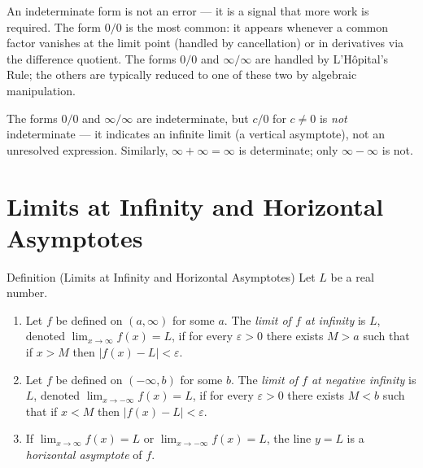 \begin{remark*}
An indeterminate form is not an error --- it is a signal that
more work is required.
The form $0/0$ is the most common: it appears whenever a common
factor vanishes at the limit point (handled by cancellation)
or in derivatives via the difference quotient.
The forms $0/0$ and $\infty/\infty$ are handled by
L'H\^opital's Rule; the others are typically reduced to one
of these two by algebraic manipulation.
\end{remark*}

\begin{remark*}
The forms $0/0$ and $\infty/\infty$ are indeterminate, but $c/0$
for $c \neq 0$ is \emph{not} indeterminate --- it indicates an
infinite limit (a vertical asymptote), not an unresolved
expression.
Similarly, $\infty + \infty = \infty$ is determinate; only
$\infty - \infty$ is not.
\end{remark*}

\section*{Limits at Infinity and Horizontal Asymptotes}

\begin{propositionbox}{Definition (Limits at Infinity and Horizontal Asymptotes)}
Let $L$ be a real number.
\begin{enumerate}
  \item Let $f$ be defined on $(a, \infty)$ for some $a$.
        The \emph{limit of $f$ at infinity} is $L$, denoted
        $\lim_{x \to \infty} f(x) = L$, if for every
        $\varepsilon > 0$ there exists $M > a$ such that if
        $x > M$ then $|f(x) - L| < \varepsilon$.

  \item Let $f$ be defined on $(-\infty, b)$ for some $b$.
        The \emph{limit of $f$ at negative infinity} is $L$,
        denoted $\lim_{x \to -\infty} f(x) = L$, if for every
        $\varepsilon > 0$ there exists $M < b$ such that if
        $x < M$ then $|f(x) - L| < \varepsilon$.

  \item If $\lim_{x \to \infty} f(x) = L$ or
        $\lim_{x \to -\infty} f(x) = L$, the line $y = L$ is a
        \emph{horizontal asymptote} of $f$.
\end{enumerate}
\end{propositionbox}

